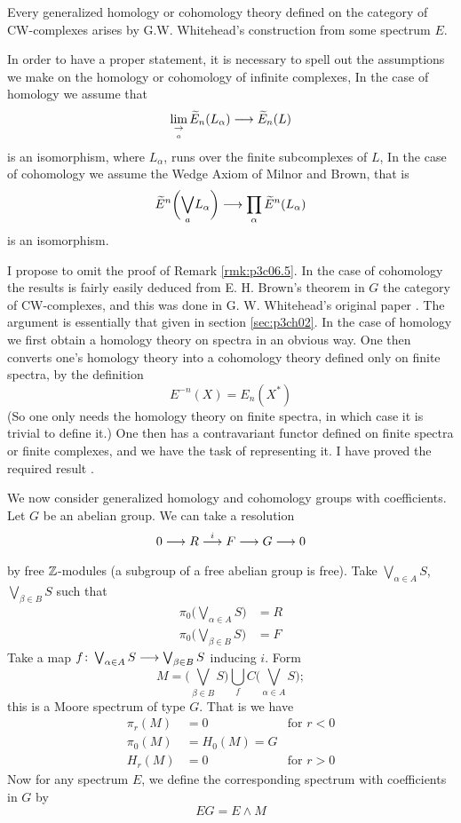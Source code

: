 \documentclass[../main]{subfiles}
\begin{document}
\begin{remark}\label{rmk:p3c06.5}
Every generalized homology or cohomology theory defined on the category of CW-complexes arises by G.W. Whitehead’s construction from some spectrum $E$.
\end{remark}

In order to have a proper statement, it is necessary to spell out the assumptions we make on the homology or cohomology of infinite complexes, In the case of homology we assume that
\[\lim_{\underset{a}{\to}} \widetilde{E}_n(L_\alpha) \longrightarrow \widetilde{E}_n(L)\]
is an isomorphism, where $L_\alpha$, runs over the finite subcomplexes of $L$, In the case of cohomology we assume the Wedge Axiom of Milnor and Brown, that is
\[\widetilde{E}^n\bigg( \underset{a}{\bigvee}L_\alpha \bigg) \longrightarrow \prod_\alpha\widetilde{E}^n(L_\alpha)\]
is an isomorphism.

I propose to omit the proof of Remark \ref{rmk:p3c06.5}. In the case of cohomology the results is fairly easily deduced from E. H. Brown's theorem in $G$ the category of CW-complexes, and this was done in G. W. Whitehead's original paper \cite{whitehead}. The argument is essentially that given in section \ref{sec:p3ch02}. In the case of homology we first obtain a homology theory on spectra in an obvious way. One then converts one's homology theory into a cohomology theory defined only on finite spectra, by the definition
\[E^{-n}(X)=E_n(X^\ast)\]
(So one only needs the homology theory on finite spectra, in which case it is trivial to define it.) One then has a contravariant functor defined on finite spectra or finite complexes, and we have the task of representing it. I have proved the required result \cite{adams4}.

We now consider generalized homology and cohomology groups with coefficients. Let $G$ be an abelian group. We can take a resolution \[0\lra R \lar{i} F \lra G \lra 0\] by free $\mathbb{Z}$-modules (a subgroup of a free abelian group is free). Take $\bigvee_{\alpha\in A} S$, $\bigvee_{\beta\in B} S$ such that
\begin{align}
    \pi_0 \bigg(\bigvee_{\alpha\in A} S \bigg) &= R \nonumber \\
    \pi_0 \bigg(\bigvee_{\beta \in B} S \bigg) &= F \nonumber
\end{align}
Take a map $f\colon \bigvee_{\alpha\in A} S \longrightarrow \bigvee_{\beta \in B} S$ inducing $i$. Form \[M=\bigg( \bigvee_{\beta\in B} S \bigg) \bigcup_f C\bigg( \bigvee_{\alpha\in A} S \bigg);\] this is a Moore spectrum of type $G$. That is we have
\begin{align}
    \pi_r(M) &= 0 &\text{for } r<0 \nonumber \\
    \pi_0(M) &=H_0(M)=G \nonumber \\
    H_r(M) &=0 &\text{for } r>0 \nonumber
\end{align}
Now for any spectrum $E$, we define the corresponding spectrum with coefficients in $G$ by
\[EG=E\wedge M\]
\end{document}
